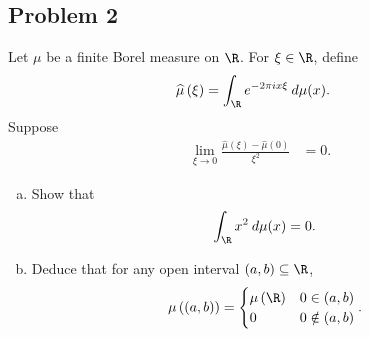 \documentclass[10pt]{mypackage}
\begin{document}
\subsection{Problem 2}%
\begin{problem}
  Let $\mu$ be a finite Borel measure on $\R$. For $\xi\in\R$, define
  \begin{align*}
    \widehat{\mu}\left( \xi \right) &= \int_{\R}^{} e^{-2\pi i x\xi}\:d\mu(x).
  \end{align*}
  Suppose
  \begin{align*}
    \lim_{\xi\rightarrow 0} \frac{\widehat{\mu}\left( \xi \right) - \widehat{\mu}(0)}{\xi^2} &= 0.
  \end{align*}
  \begin{enumerate}[(a)]
    \item Show that
      \begin{align*}
        \int_{\R}^{} x^2\:d\mu(x) &= 0.
      \end{align*}
    \item Deduce that for any open interval $\left( a,b \right)\subseteq \R$,
      \begin{align*}
        \mu\left( \left( a,b \right) \right) &= \begin{cases}
          \mu\left( \R \right) & 0\in (a,b)\\
          0 & 0\notin (a,b)
        \end{cases}.
      \end{align*}
  \end{enumerate}
\end{problem}
\end{document}
